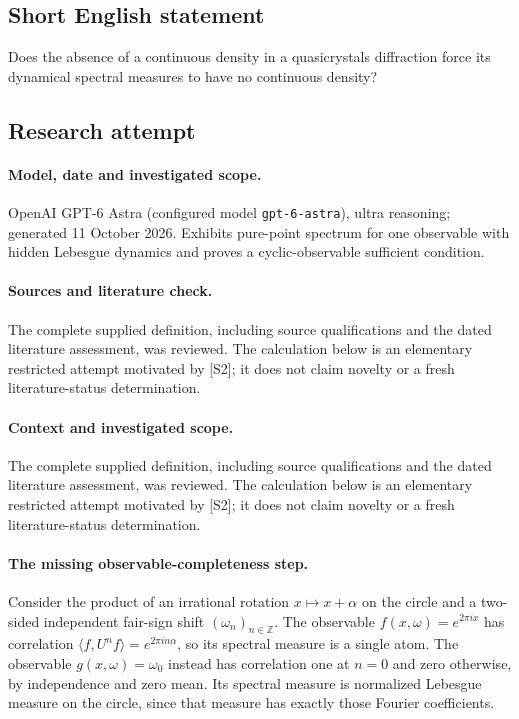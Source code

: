 \documentclass[11pt]{article}
\begin{document}
\subsection{Short English statement}
Does the absence of a continuous density in a quasicrystal\textquotesingle s diffraction force its dynamical spectral measures to have no continuous density?
\subsection{Research attempt}
\paragraph{Model, date and investigated scope.}
OpenAI GPT-6 Astra (configured model \texttt{gpt-6-astra}), ultra reasoning; generated 11 October 2026. Exhibits pure-point spectrum for one observable with hidden Lebesgue dynamics and proves a cyclic-observable sufficient condition.

\paragraph{Sources and literature check.}
The complete supplied definition, including source qualifications and the dated literature assessment, was reviewed. The calculation below is an elementary restricted attempt motivated by [S2]; it does not claim novelty or a fresh literature-status determination.

\paragraph{Context and investigated scope.} The complete supplied definition, including source qualifications and the dated literature assessment, was reviewed. The calculation below is an elementary restricted attempt motivated by [S2]; it does not claim novelty or a fresh literature-status determination.

\paragraph{The missing observable-completeness step.} Consider the product of an irrational rotation $x\mapsto x+\alpha$ on the circle and a two-sided independent fair-sign shift $(\omega_n)_{n\in\mathbb Z}$. The observable $f(x,\omega)=e^{2\pi ix}$ has correlation $\langle f,U^nf\rangle=e^{2\pi in\alpha}$, so its spectral measure is a single atom. The observable $g(x,\omega)=\omega_0$ instead has correlation one at $n=0$ and zero otherwise, by independence and zero mean. Its spectral measure is normalized Lebesgue measure on the circle, since that measure has exactly those Fourier coefficients.
\end{document}
